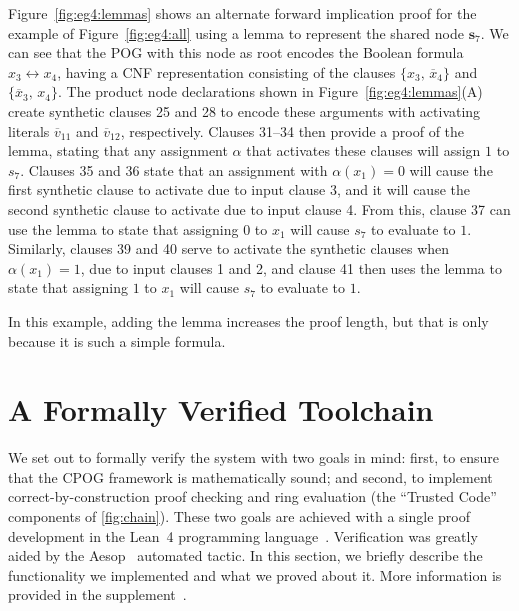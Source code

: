 \documentclass[twoside,11pt]{article}
\newcommand{\obar}[1]{\overline{#1}}
\newcommand{\assign}{\alpha}
\newcommand{\makenode}[1]{\mathbf{#1}}
\newcommand{\nodes}{\makenode{s}}
\newcommand{\lean}{Lean~4}
\begin{document}
Figure~\ref{fig:eg4:lemmas} shows an alternate forward implication
proof for the example of Figure~\ref{fig:eg4:all} using a lemma to
represent the shared node $\nodes_7$.  We can see that the POG with
this node as root encodes the Boolean formula $x_3 \leftrightarrow x_4$, having a CNF representation consisting of the clauses
$\{x_3 ,\, \obar{x}_4\}$ and $\{\obar{x}_3 ,\, {x}_4\}$.  The product node
declarations shown in Figure~\ref{fig:eg4:lemmas}(A) create synthetic
clauses 25 and 28 to encode these arguments with activating literals
$\obar{v}_{11}$ and $\obar{v}_{12}$, respectively.  Clauses 31--34
then provide a proof of the lemma, stating that any assignment
$\assign$ that activates these clauses will  assign $1$ to $s_7$.
Clauses 35 and 36 state that an assignment with $\assign(x_1) = 0$
will cause the first synthetic clause to activate due to input clause
3, and it will cause the second synthetic clause to activate due to
input clause 4.  From this, clause 37 can use the lemma to state that
assigning $0$ to $x_1$ will cause $s_7$ to evaluate to $1$.  Similarly,
clauses 39 and 40 serve to activate the synthetic clauses when
$\assign(x_1) = 1$, due to input clauses 1 and 2, and clause 41 then
uses the lemma to state that assigning $1$ to $x_1$ will cause $s_7$ to
evaluate to $1$.

In this example, adding the lemma increases the proof length, but that
is only because it is such a simple formula.



\section{A Formally Verified Toolchain}
\label{section:formally-verified-toolchain}

We set out to formally verify the system with two goals in mind: first, to ensure that the CPOG framework is mathematically
sound; and second, to implement correct-by-construction proof checking and ring evaluation (the ``Trusted Code'' components of \ref{fig:chain}). These two goals are achieved with a single proof development in the \lean{} programming language~\cite{demoura:cade:2021}. Verification was greatly aided by the Aesop~\cite{23limperg_aesop_white_box_best_first_proof_search_lean} automated tactic. In this section, we briefly describe the functionality we implemented and what we proved about it. More information is provided in the supplement~\cite{bryant:sat:2023:supplement}.
\end{document}

